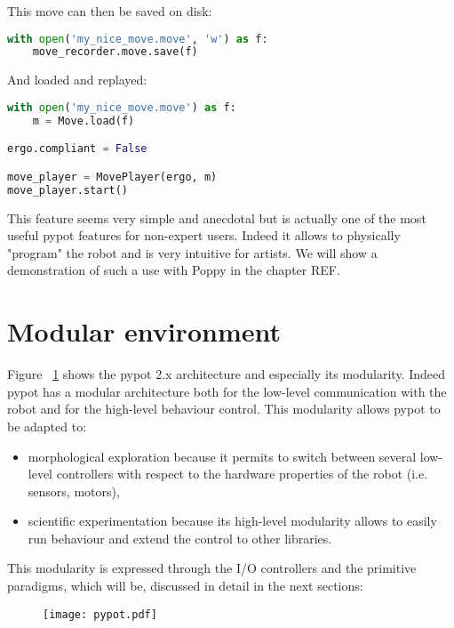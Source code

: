 This move can then be saved on disk:
\begin{lstlisting}[language = Python]
with open('my_nice_move.move', 'w') as f:
    move_recorder.move.save(f)
\end{lstlisting}

And loaded and replayed:
\begin{lstlisting}[language = Python]
with open('my_nice_move.move') as f:
    m = Move.load(f)

ergo.compliant = False

move_player = MovePlayer(ergo, m)
move_player.start()
\end{lstlisting}

This feature seems very simple and anecdotal but is actually one of the most useful pypot features for non-expert users. Indeed it allows to physically "program" the robot and is very intuitive for artists. We will show a demonstration of such a use with Poppy in the chapter REF.



\section{Modular environment} %

Figure \figurename~\ref{fig:pypot-modular-architecture} shows the pypot 2.x architecture and especially its modularity. Indeed pypot has a modular architecture both for the low-level communication with the robot and for the high-level behaviour control. This modularity allows pypot to be adapted to:

\begin{itemize}
    \item morphological exploration because it permits to switch between several low-level controllers with respect to the hardware properties of the robot (i.e. sensors, motors),
    \item scientific experimentation because its high-level modularity allows to easily run behaviour and extend the control to other libraries.
\end{itemize}

This modularity is expressed through the I/O controllers and the primitive paradigms, which will be, discussed in detail in the next sections:


\begin{figure}[p]
    \begin{center}
        \texttt{[image: pypot.pdf]}
    \end{center}
    \caption{}
    \label{fig:pypot-modular-architecture}
\end{figure}


